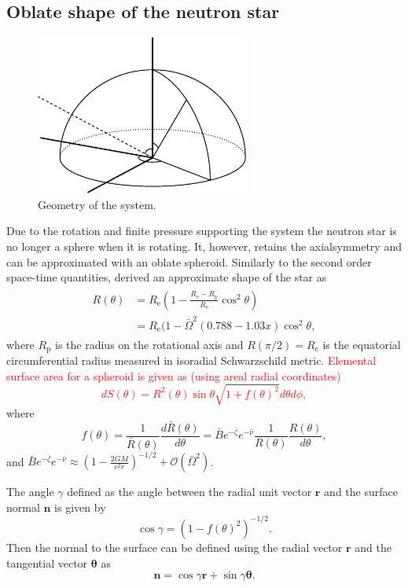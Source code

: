 \documentclass[iop, usenatbib]{emulateapj}
\newcommand{\be}{\begin{equation}}
\newcommand{\ee}{\end{equation}}
\renewcommand{\vec}[1]{\ensuremath{\boldsymbol{#1}}​}
\newcommand{\red}[1]{\textcolor{red}{#1}}
\newcommand{\Req}{\ensuremath{R_{\mathrm{e}}}}
\newcommand{\sch}{Schwarzschild }
\newcommand{\Ob}{\ensuremath{\bar{\Omega}}}
\newcommand{\nub}{\ensuremath{\bar{\nu}}}
\newcommand{\zetab}{\ensuremath{\bar{\zeta}}}
\newcommand{\Bb}{\ensuremath{\bar{B}}}
\begin{document}
\subsection{Oblate shape of the neutron star}

\begin{figure}
\centering
\includegraphics[width=7cm]{figs/fig1.eps}
\caption{\label{fig:geom}
  Geometry of the system.
}
\end{figure}


Due to the rotation and finite pressure supporting the system the neutron star is no longer a sphere when it is rotating.
It, however, retains the axialsymmetry and can be approximated with an oblate spheroid.
Similarly to the second order space-time quantities, \citet{aGM14} derived an approximate shape of the star as
\begin{align}\begin{split}
    R(\theta) &= \Req \left( 1 - \frac{\Req - R_{\mathrm{p}}}{\Req} \cos^2\theta \right) \\
              &= \Req (1-\Ob^2 (0.788 - 1.03x) \cos^2 \theta,
\end{split}\end{align}
where $R_{\mathrm{p}}$ is the radius on the rotational axis and $R(\pi/2) = \Req$ is the equatorial circumferential radius measured in isoradial \sch metric. 
\red{Elemental surface area for a spheroid is given as (using areal radial coordinates)
\be
dS(\theta) = R^2(\theta) \sin\theta \sqrt{1 + f(\theta)^2}d\theta d\phi,
\ee
}
where
\be
f(\theta) = \frac{1}{\bar{R}(\theta)} \frac{d \bar{R}(\theta)}{d \theta} = \Bb e^{-\zetab} e^{-\nub} \frac{1}{R(\theta)} \frac{R(\theta)}{d\theta}, 
\ee
and $\Bb e^{-\zetab} e^{-\nub} \approx (1-\frac{2 G M}{c^2 r})^{-1/2} + \mathcal{O}(\Ob^2)$.


The angle $\gamma$ defined as the angle between the radial unit vector $\vec{r}$ and the surface normal $\vec{n}$ is given by
\be
\cos\gamma = (1 - f(\theta)^2)^{-1/2}.
\ee
Then the normal to the surface can be defined using the radial vector $\vec{r}$ and the tangential vector $\vec{\theta}$ as
\be
\vec{n} = \cos\gamma \vec{r} + \sin\gamma \vec{\theta}.
\ee
\end{document}
